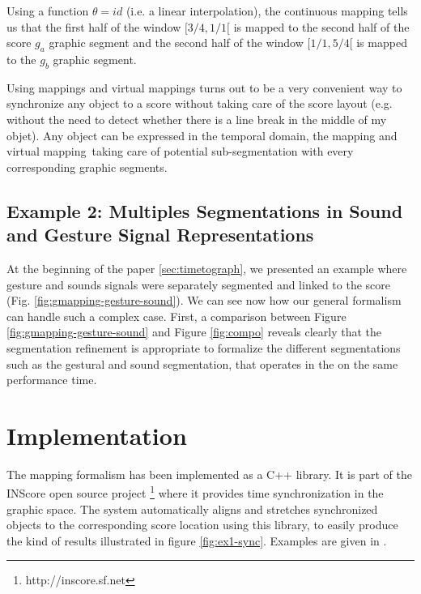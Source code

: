 \documentclass[letterpaper, 12pt]{article}
\newcommand{\vdmapping}		{virtual mapping}
\newcommand{\vdmapping}		{continuous mapping}
\begin{document}
Using a function $\theta=id$ (i.e. a linear interpolation), the continuous mapping tells us that the first half of the window $[3/4, 1/1[$ is mapped to the second half of the score $g_a$ graphic segment and the second half of the window 
$[1/1, 5/4[$ is mapped to the $g_b$ graphic segment.

Using mappings and \vdmapping s turns out to be a very convenient way to synchronize any object to a score without taking care of the score layout (e.g.  without the need to detect whether there is a line break in the middle of my objet). Any object can be expressed in the temporal domain, the mapping and \vdmapping\ taking care of potential sub-segmentation with every corresponding graphic segments.


\subsection{Example 2: Multiples Segmentations in Sound and Gesture Signal Representations}

At the beginning of the paper \ref{sec:timetograph}, we presented an example where gesture and sounds signals were separately segmented and linked to the score (Fig.   \ref{fig:gmapping-gesture-sound}). We can see now how our general formalism can handle such a complex case. First, a comparison between Figure \ref{fig:gmapping-gesture-sound} and Figure \ref{fig:compo} reveals clearly that the segmentation refinement is appropriate to formalize the different segmentations such as the gestural and sound segmentation, that operates in the on the same performance time. 



\section{Implementation}
The mapping formalism has been implemented as a C++ library. It is part of the INScore open source project \footnote{http://inscore.sf.net} where it provides time synchronization in the graphic space. The system automatically aligns and stretches synchronized objects to the corresponding score location using this library, to easily produce the kind of results illustrated in figure \ref{fig:ex1-sync}. Examples are given in \cite{Fober:10c}\cite{Fober:12a}.
\end{document}
